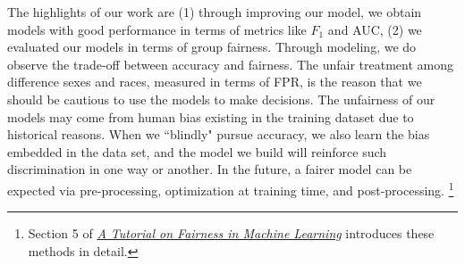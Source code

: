 The highlights of our work are (1) through improving our model, we obtain models with good performance in terms of metrics like $F_1$ and AUC, (2) we evaluated our models in terms of group fairness. Through modeling, we do observe the trade-off between accuracy and fairness. The unfair treatment among difference sexes and races, measured in terms of FPR, is the reason that we should be cautious to use the models to make decisions. The unfairness of our models may come from human bias existing in the training dataset due to historical reasons. When we ``blindly" pursue accuracy, we also learn the bias embedded in the data set, and the model we build will reinforce such discrimination in one way or another. In the future, a fairer model can be expected via pre-processing, optimization at training time, and post-processing. \footnote{Section 5 of \href{https://towardsdatascience.com/a-tutorial-on-fairness-in-machine-learning-3ff8ba1040cb}{\textit{A Tutorial on Fairness in Machine Learning}} introduces these methods in detail.}




